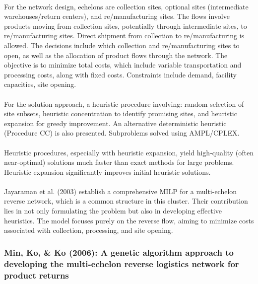 \paragraph{} For the network design, echelons are collection sites, optional sites (intermediate warehouses/return centers), and re/manufacturing sites. The flows involve products moving from collection sites, potentially through intermediate sites, to re/manufacturing sites. Direct shipment from collection to re/manufacturing is allowed. The decisions include which collection and re/manufacturing sites to open, as well as the allocation of product flows through the network. The objective is to minimize total costs, which include variable transportation and processing costs, along with fixed costs. Constraints include demand, facility capacities, site opening.

\paragraph{} For the solution approach, a heuristic procedure involving: random selection of site subsets, heuristic concentration to identify promising sites, and heuristic expansion for greedy improvement. An alternative deterministic heuristic (Procedure CC) is also presented. Subproblems solved using AMPL/CPLEX.

\paragraph{} Heuristic procedures, especially with heuristic expansion, yield high-quality (often near-optimal) solutions much faster than exact methods for large problems. Heuristic expansion significantly improves initial heuristic solutions.

\paragraph{} Jayaraman et al. (2003) establish a comprehensive MILP for a multi-echelon reverse network, which is a common structure in this cluster. Their contribution lies in not only formulating the problem but also in developing effective heuristics. The model focuses purely on the reverse flow, aiming to minimize costs associated with collection, processing, and site opening.

\subsubsection{Min, Ko, \& Ko (2006): A genetic algorithm approach to developing the multi-echelon reverse logistics network for product returns}
